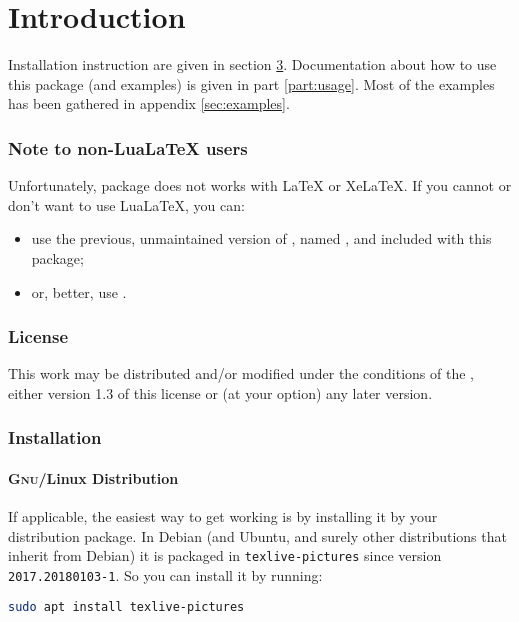 \documentclass[
  load-preamble-,
  babel-options=english,
  add-index=true,
]{cnltx-doc}
\begin{document}
\part{Introduction}

Installation instruction are given in section \ref{sec:install}.
Documentation about how to use this package (and examples) is given in part \ref{part:usage}. Most of the examples has been gathered in appendix \ref{sec:examples}.

\section{Note to non-Lua\LaTeX{} users}

Unfortunately, package  does not works with \LaTeX{} or Xe\LaTeX. If you cannot or don't want to use Lua\LaTeX{}, you can:
\begin{itemize}
  \item use the previous, unmaintained version of , named , and included with this package;
  \item or, better, use .
\end{itemize}

\section{License}

This work may be distributed and/or modified under the conditions of the \LPPL, either version 1.3 of this license or (at your option) any later version.

\section{Installation}
\label{sec:install}

\subsection{\textsc{Gnu}/Linux Distribution}

If applicable, the easiest way to get  working is by installing it by your distribution package. In Debian (and Ubuntu, and surely other distributions that inherit from Debian) it is packaged in \texttt{texlive-pictures} since version \texttt{2017.20180103-1}. So you can install it by running:

\begin{lstlisting}[language=sh]
sudo apt install texlive-pictures
\end{lstlisting}
\end{document}
